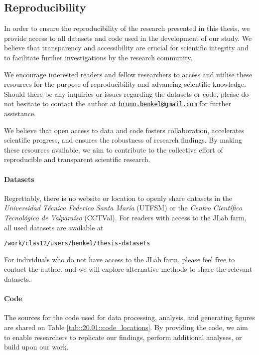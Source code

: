 \subsection{Reproducibility}
\label{20.01::reproducibility}
    In order to ensure the reproducibility of the research presented in this thesis, we provide access to all datasets and code used in the development of our study.
    We believe that transparency and accessibility are crucial for scientific integrity and to facilitate further investigations by the research community.

    We encourage interested readers and fellow researchers to access and utilise these resources for the purpose of reproducibility and advancing scientific knowledge.
    Should there be any inquiries or issues regarding the datasets or code, please do not hesitate to contact the author at \href{mailto:bruno.benkel@gmail.com}{\texttt{bruno.benkel@gmail.com}} for further assistance.

    We believe that open access to data and code fosters collaboration, accelerates scientific progress, and ensures the robustness of research findings.
    By making these resources available, we aim to contribute to the collective effort of reproducible and transparent scientific research.

    \paragraph{Datasets}
        Regrettably, there is no website or location to openly share datasets in the \textit{Universidad Técnica Federico Santa María} (UTFSM) or the \textit{Centro Científico Tecnológico de Valparaíso} (CCTVal).
        For readers with access to the JLab farm, all used datasets are available at

        \begin{center}
            \texttt{/work/clas12/users/benkel/thesis-datasets}
        \end{center}

        For individuals who do not have access to the JLab farm, please feel free to contact the author, and we will explore alternative methods to share the relevant datasets.

    \paragraph{Code}
        The sources for the code used for data processing, analysis, and generating figures are shared on Table \ref{tab::20.01::code_locations}.
        By providing the code, we aim to enable researchers to replicate our findings, perform additional analyses, or build upon our work.

